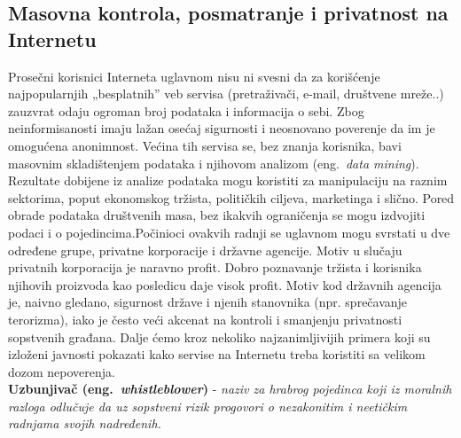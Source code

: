 \documentclass[a4paper]{article}
\begin{document}
\subsection{Masovna kontrola, posmatranje i privatnost na Internetu}
\label{subsec:podnaslovIP4}
\indent\indent Prosečni korisnici Interneta uglavnom nisu ni svesni da za korišćenje najpopularnjih „besplatnih” veb servisa (pretraživači, e-mail, društvene mreže..) zauzvrat odaju ogroman broj podataka i informacija o sebi. Zbog neinformisanosti imaju lažan osećaj sigurnosti i neosnovano poverenje da im je omogućena anonimnost. Većina tih servisa se, bez znanja korisnika, bavi masovnim skladištenjem podataka i njihovom analizom (eng.~{\em data mining}). Rezultate dobijene iz analize podataka mogu koristiti za manipulaciju na raznim sektorima, poput ekonomskog tržista, političkih ciljeva, marketinga i slično. Pored obrade podataka društvenih masa, bez ikakvih ograničenja se mogu izdvojiti podaci i o pojedincima.\newline Počinioci ovakvih radnji se uglavnom mogu svrstati u dve određene grupe, privatne korporacije i državne agencije. Motiv u slučaju privatnih korporacija je naravno profit. Dobro poznavanje tržista i korisnika njihovih proizvoda kao posledicu daje visok profit. Motiv kod državnih agencija je, naivno gledano, sigurnost države i njenih stanovnika (npr. sprečavanje terorizma), iako je često veći akcenat na kontroli i smanjenju privatnosti sopstvenih građana. Dalje ćemo kroz nekoliko najzanimljivijih primera koji su izloženi javnosti pokazati kako servise na Internetu treba koristiti sa velikom dozom nepoverenja.\\\textbf{Uzbunjivač (eng.~{\em whistleblower})} - \textit{naziv za hrabrog pojedinca koji iz moralnih razloga odlučuje da uz sopstveni rizik progovori o nezakonitim i neetičkim radnjama svojih nadređenih.}
\end{document}
